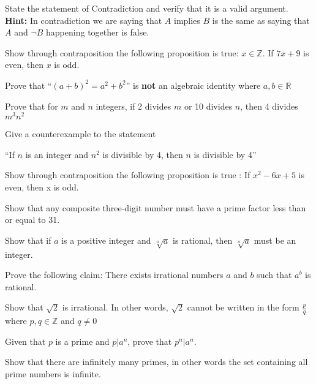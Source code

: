\documentclass{article}
\newenvironment{problem}[2][Problem]{\begin{trivlist}
\item[\hskip \labelsep {\bfseries #1}\hskip \labelsep {\bfseries #2.}]}{\end{trivlist}}
\begin{document}
\begin{problem}{3}
State the statement of Contradiction and verify that it is a valid argument.\\
\textbf{Hint:} In contradiction we are saying that $A$ implies $B$ is the same as saying that $A$ and $\neg B$ happening together is false.
\end{problem}
\begin{problem}{4}
Show through contraposition the following proposition is true: $x \in \mathbb{Z}$. If $7x + 9$ is even, then $x$ is odd.
\end{problem}
\begin{problem}{5}
Prove that ``$(a+b)^2 = a^2 +b^2$'' is \textbf{not} an algebraic identity where $a,b \in \mathbb{R}$
\end{problem}
\begin{problem}{6}
Prove that for $m$ and $n$ integers, if 2 divides $m$ or 10 divides $n$, then 4 divides $m^{3}n^{2}$
\end{problem}
\begin{problem}{7}
Give a counterexample to the statement
\begin{center}
    ``If $n$ is an integer and $n^2$ is divisible by 4, then $n$ is divisible by 4''
\end{center}
\end{problem}
\begin{problem}{8}
Show through contraposition the following proposition is true : If $x^{2} - 6x + 5$ is even, then x is odd.
\end{problem}
\begin{problem}{9}
Show that any composite three-digit number must have a prime factor less than or equal to 31.
\end{problem}
\begin{problem}{10}
Show that if $a$ is a positive integer and $\sqrt[n]{a}$ is rational, then $\sqrt[n]{a}$ must be an integer.
\end{problem}
\begin{problem}{11}
Prove the following claim: There exists irrational numbers $a$ and $b$ such that $a^b$ is rational.
\end{problem}
\begin{problem}{12}
Show that $\sqrt{2}$ is irrational. In other words, $\sqrt{2}$ cannot be written in the form $\frac{p}{q}$ where $p,q \in \mathbb{Z}$ and $q \neq 0$
\end{problem}

\begin{problem}{13}
Given that $p$ is a prime and $p|a^n$, prove that $p^n|a^n$. \end{problem}
\begin{problem}{14}
Show that there are infinitely many primes, in other words the set containing all prime numbers is infinite.
\end{problem}
\end{document}
